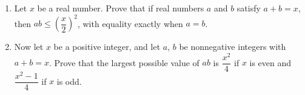 \begin{enumerate}
\item[(a)] Let $x$ be a real number. Prove that if real numbers $a$ and $b$ satisfy $a+b=x$, then $ab\le\left(\dfrac x2\right)^2$, with equality exactly when $a=b$.
\item[(b)] Now let $x$ be a positive integer, and let $a$, $b$ be nonnegative integers with $a+b=x$. Prove that the largest possible value of $ab$ is $\dfrac{x^2}4$ if $x$ is even and $\dfrac{x^2-1}4$ if $x$ is odd.
\end{enumerate}
